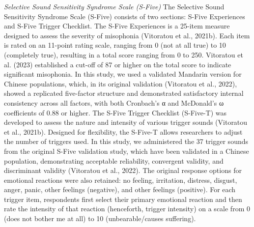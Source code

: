 \textit{Selective Sound Sensitivity Syndrome Scale (S-Five)} 
The Selective Sound Sensitivity Syndrome Scale (S-Five) consists of two sections: S-Five Experiences and S-Five Trigger Checklist. The S-Five Experiences is a 25-item measure designed to assess the severity of misophonia (Vitoratou et al., 2021b). Each item is rated on an 11-point rating scale, ranging from 0 (not at all true) to 10 (completely true), resulting in a total score ranging from 0 to 250. Vitoratou et al. (2023) established a cut-off of 87 or higher on the total score to indicate significant misophonia. In this study, we used a validated Mandarin version for Chinese populations, which, in its original validation (Vitoratou et al., 2022), showed a replicated five-factor structure and demonstrated satisfactory internal consistency across all factors, with both Cronbach’s α and McDonald’s ω coefficients of 0.88 or higher. The S-Five Trigger Checklist (S-Five-T) was developed to assess the nature and intensity of various trigger sounds (Vitoratou et al., 2021b). Designed for flexibility, the S-Five-T allows researchers to adjust the number of triggers used. In this study, we administered the 37 trigger sounds from the original S-Five validation study, which have been validated in a Chinese population, demonstrating acceptable reliability, convergent validity, and discriminant validity (Vitoratou et al., 2022). The original response options for emotional reactions were also retained: no feeling, irritation, distress, disgust, anger, panic, other feelings (negative), and other feelings (positive). For each trigger item, respondents first select their primary emotional reaction and then rate the intensity of that reaction (henceforth, trigger intensity) on a scale from 0 (does not bother me at all) to 10 (unbearable/causes suffering). 
